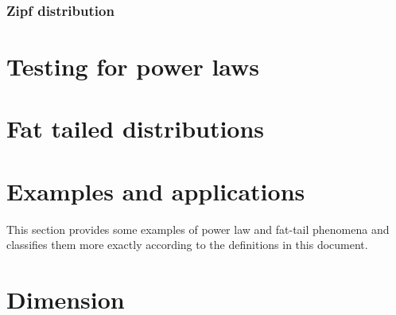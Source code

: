 \documentclass{article}
\begin{document}
\subsubsection*{Zipf distribution}

\section*{Testing for power laws}

\section*{Fat tailed distributions}

\section*{Examples and applications}

This section provides some examples of power law and fat-tail phenomena and classifies them more exactly according to the definitions in this document.

\section*{Dimension}
\end{document}
